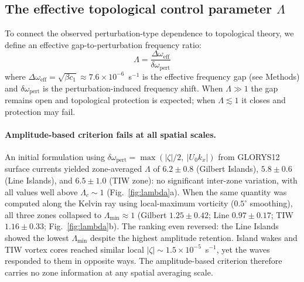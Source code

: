 \documentclass[11pt]{article}
\begin{document}
\subsection{The effective topological control parameter $\Lambda$}

To connect the observed perturbation-type dependence to topological theory, we define an effective gap-to-perturbation frequency ratio:
\begin{equation}
\Lambda = \frac{\Delta\omega_\mathrm{eff}}{\delta\omega_\mathrm{pert}}
\label{eq:lambda}
\end{equation}
where $\Delta\omega_\mathrm{eff} = \sqrt{\beta c_1} \approx 7.6 \times 10^{-6}$~s$^{-1}$ is the effective frequency gap (see Methods) and $\delta\omega_\mathrm{pert}$ is the perturbation-induced frequency shift. When $\Lambda \gg 1$ the gap remains open and topological protection is expected; when $\Lambda \lesssim 1$ it closes and protection may fail.

\paragraph{Amplitude-based criterion fails at all spatial scales.}
An initial formulation using $\delta\omega_\mathrm{pert} = \max(|\zeta|/2,\ |U_0 k_x|)$ from GLORYS12 surface currents yielded zone-averaged $\Lambda$ of $6.2 \pm 0.8$ (Gilbert Islands), $5.8 \pm 0.6$ (Line Islands), and $6.5 \pm 1.0$ (TIW zone): no significant inter-zone variation, with all values well above $\Lambda_c \sim 1$ (Fig.~\ref{fig:lambda}a). When the same quantity was computed along the Kelvin ray using local-maximum vorticity ($0.5^\circ$ smoothing), all three zones collapsed to $\Lambda_\mathrm{min} \approx 1$ (Gilbert $1.25 \pm 0.42$; Line $0.97 \pm 0.17$; TIW $1.16 \pm 0.33$; Fig.~\ref{fig:lambda}b). The ranking even reversed: the Line Islands showed the lowest $\Lambda_\mathrm{min}$ despite the highest amplitude retention. Island wakes and TIW vortex cores reached similar local $|\zeta| \sim 1.5 \times 10^{-5}$~s$^{-1}$, yet the waves responded to them in opposite ways. The amplitude-based criterion therefore carries no zone information at any spatial averaging scale.
\end{document}

